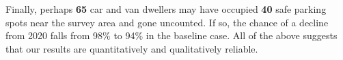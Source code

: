 \documentclass[11pt]{article}
\def\bfr{\bf\color{red}}
\def\bfp{\color{magenta}}
\begin{document}
%
%
%



{\bfp Finally, perhaps {\bfr 65} car and van dwellers may have occupied {\bfr 40} safe parking spots 
near the survey area and gone uncounted. If so, the chance of a decline from 2020 falls from 98\% to 
94\% in the baseline case.} All of the above suggests that our results are quantitatively and qualitatively 
reliable.\\
\end{document}
